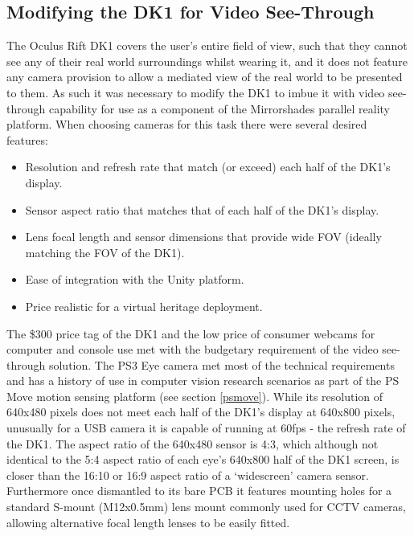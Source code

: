 \subsection{Modifying the DK1 for Video See-Through}
\label{modifying-dk1}
The Oculus Rift DK1 covers the user's entire field of view, such that they cannot see any of their real world surroundings whilst wearing it, and it does not feature any camera provision to allow a mediated view of the real world to be presented to them. As such it was necessary to modify the DK1 to imbue it with video see-through capability for use as a component of the Mirrorshades parallel reality platform. When choosing cameras for this task there were several desired features:
\begin{itemize}
	\item Resolution and refresh rate that match (or exceed) each half of the DK1's display.
	\item Sensor aspect ratio that matches that of each half of the DK1's display.
	\item Lens focal length and sensor dimensions that provide wide FOV (ideally matching the FOV of the DK1).
	\item Ease of integration with the Unity platform.
	\item Price realistic for a virtual heritage deployment.
\end{itemize}

The \$300 price tag of the DK1 and the low price of consumer webcams for computer and console use met with the budgetary requirement of the video see-through solution. The PS3 Eye camera met most of the technical requirements and has a history of use in computer vision research scenarios as part of the PS Move motion sensing platform (see section \ref{psmove}). While its resolution of 640x480 pixels does not meet each half of the DK1's display at 640x800 pixels, unusually for a USB camera it is capable of running at 60fps - the refresh rate of the DK1. The aspect ratio of the 640x480 sensor is 4:3, which although not identical to the 5:4 aspect ratio of each eye's 640x800 half of the DK1 screen, is closer than the 16:10 or 16:9 aspect ratio of a `widescreen' camera sensor. Furthermore once dismantled to its bare PCB it features mounting holes for a standard S-mount (M12x0.5mm) lens mount commonly used for CCTV cameras, allowing alternative focal length lenses to be easily fitted.

